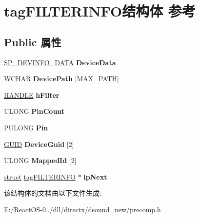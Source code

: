 \hypertarget{structtag_f_i_l_t_e_r_i_n_f_o}{}\section{tag\+F\+I\+L\+T\+E\+R\+I\+N\+F\+O结构体 参考}
\label{structtag_f_i_l_t_e_r_i_n_f_o}
\subsection*{Public 属性}
\begin{DoxyCompactItemize}
\item 
\mbox{\label{structtag_f_i_l_t_e_r_i_n_f_o_a3b54c8343dbbb9f4b415f31260680f49}} 
\hyperlink{struct___s_p___d_e_v_i_n_f_o___d_a_t_a}{S\+P\+\_\+\+D\+E\+V\+I\+N\+F\+O\+\_\+\+D\+A\+TA} {\bfseries Device\+Data}
\item 
\mbox{\label{structtag_f_i_l_t_e_r_i_n_f_o_a3ac2d9c47bd6b6049975aa30e74c7e7f}} 
W\+C\+H\+AR {\bfseries Device\+Path} \mbox{[}M\+A\+X\+\_\+\+P\+A\+TH\mbox{]}
\item 
\mbox{\label{structtag_f_i_l_t_e_r_i_n_f_o_ae1c0cb14599adba6ea26cbaf6b5c36ab}} 
\hyperlink{interfacevoid}{H\+A\+N\+D\+LE} {\bfseries h\+Filter}
\item 
\mbox{\label{structtag_f_i_l_t_e_r_i_n_f_o_a270276a3e09ca52d38dfe21cb009faad}} 
U\+L\+O\+NG {\bfseries Pin\+Count}
\item 
\mbox{\label{structtag_f_i_l_t_e_r_i_n_f_o_a52bcfb8b151dba7ebb9329c99acab323}} 
P\+U\+L\+O\+NG {\bfseries Pin}
\item 
\mbox{\label{structtag_f_i_l_t_e_r_i_n_f_o_a9af02d0bb0b6f221e61af63bd6bab0c3}} 
\hyperlink{interface_g_u_i_d}{G\+U\+ID} {\bfseries Device\+Guid} \mbox{[}2\mbox{]}
\item 
\mbox{\label{structtag_f_i_l_t_e_r_i_n_f_o_ae40139020e4357d9672a48366794297b}} 
U\+L\+O\+NG {\bfseries Mapped\+Id} \mbox{[}2\mbox{]}
\item 
\mbox{\label{structtag_f_i_l_t_e_r_i_n_f_o_a042a79cfaf699ff14ad650d76ef5828f}} 
\hyperlink{interfacestruct}{struct} \hyperlink{structtag_f_i_l_t_e_r_i_n_f_o}{tag\+F\+I\+L\+T\+E\+R\+I\+N\+FO} $\ast$ {\bfseries lp\+Next}
\end{DoxyCompactItemize}


该结构体的文档由以下文件生成\+:\begin{DoxyCompactItemize}
\item 
E\+:/\+React\+O\+S-\/0../dll/directx/dsound\+\_\+new/precomp.\+h\end{DoxyCompactItemize}
